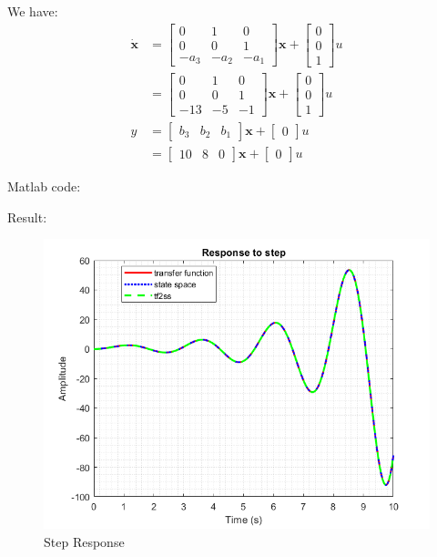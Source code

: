 We have:
\begin{equation}
    \begin{aligned}
        \dot{\textbf{x}} &=
        \begin{bmatrix}
            0    & 1    & 0\\
            0    & 0    & 1\\
            -a_3 & -a_2 & -a_1
        \end{bmatrix}
        \textbf{x} + 
        \begin{bmatrix}
            0 \\ 0 \\ 1
        \end{bmatrix}
        u \\ &=
        \begin{bmatrix}
            0    & 1    & 0\\
            0    & 0    & 1\\
            -13  & -5   & -1
        \end{bmatrix}
        \textbf{x} + 
        \begin{bmatrix}
            0 \\ 0 \\ 1
        \end{bmatrix}
        u \\
        y &=
        \begin{bmatrix}
            b_3 & b_2 & b_1
        \end{bmatrix}
        \textbf{x} + 
        \begin{bmatrix}
            0
        \end{bmatrix}
        u \\ &=
        \begin{bmatrix}
            10 & 8 & 0
        \end{bmatrix}
        \textbf{x} + 
        \begin{bmatrix}
            0
        \end{bmatrix}
        u
    \end{aligned}
\end{equation}

Matlab code:
    
Result:
\begin{figure}[htp]
    \centering
    \includegraphics[width=12cm]{images/Q5_b_fig.png}
    \caption{Step Response}
    \label{fig:Q5b}
\end{figure}
\pagebreak
